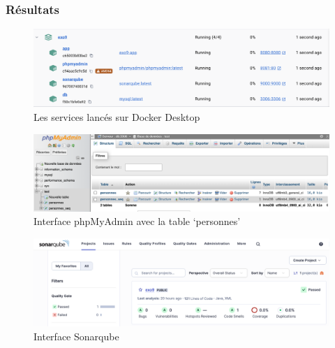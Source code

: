 \subsubsection*{Résultats}
\begin{figure}[hbtp]
    \centering
    \includegraphics[width=\textwidth]{images/exo9_desktop.png}
    \caption{Les services lancés sur Docker Desktop}
    \label{fig:exo9_services}
\end{figure}

\begin{figure}[hbtp]
    \centering
    \includegraphics[width=\textwidth]{images/phpMyAdmin.png}
    \caption{Interface phpMyAdmin avec la table `personnes'}
    \label{fig:phpmyadmin}
\end{figure}

\begin{figure}[hbtp]
    \centering
    \includegraphics[width=\textwidth]{images/sonarqube.png}
    \caption{Interface Sonarqube}
    \label{fig:Sonarqube}
\end{figure}

